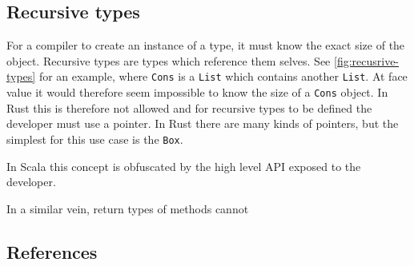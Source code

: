 \documentclass[ oneside,%
                    author={James Elgar},
                    degree={MEng},
                     title={Bidirectional transformer between functional and \\ object-oriented programming in Rust},
                  subtitle={}]{dissertation}
\begin{document}
\subsection{Recursive types}

For a compiler to create an instance of a type, it must know the exact size of the object. Recursive types are types which reference them selves. See \autoref{fig:recusrive-types} for an example, where \verb|Cons| is a \verb|List| which contains another \verb|List|. At face value it would therefore seem impossible to know the size of a \verb|Cons| object. In Rust this is therefore not allowed and for recursive types to be defined the developer must use a pointer. In Rust there are many kinds of pointers, but the simplest for this use case is the \verb|Box|.

In Scala this concept is obfuscated by the high level API exposed to the developer.

In a similar vein, return types of methods cannot  

\subsection{References}





\end{document}
